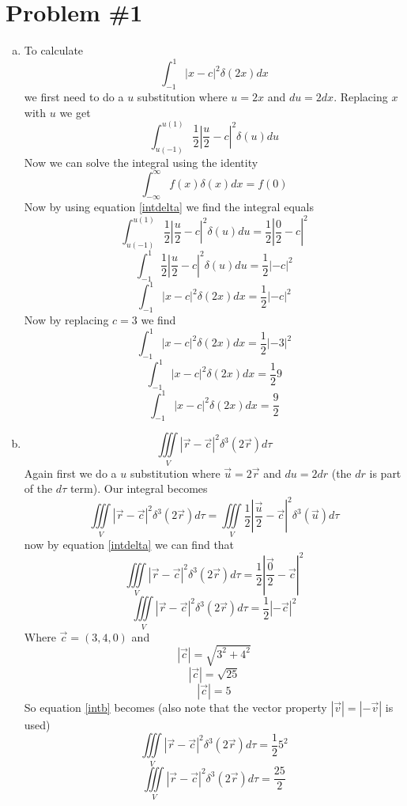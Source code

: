 \documentclass[11pt]{article}
\numberwithin{equation}{section}
\begin{document}


\section{Problem \#1}
\begin{enumerate}[(a)]
\item
To calculate 
\begin{equation}
\int_{-1}^{1} |x-c|^2 \delta(2x) dx
\label{inta}
\end{equation}
we first need to do a $u$ substitution where $u = 2x$ and $du = 2dx$. Replacing $x$ with $u$ we get
$$\int_{u(-1)}^{u(1)} \frac{1}{2} \left|\frac{u}{2}-c\right|^2 \delta(u) du$$
Now we can solve the integral using the identity 
\begin{equation}
\int_{-\infty}^{\infty} f(x) \delta(x) dx = f(0)
\label{intdelta}
\end{equation}
Now by using equation \ref{intdelta} we find the integral equals 
$$\int_{u(-1)}^{u(1)} \frac{1}{2} \left|\frac{u}{2}-c\right|^2 \delta(u) du = \frac{1}{2}\left|\frac{0}{2}-c\right|^2 $$
$$\int_{-1}^{1} \frac{1}{2} \left|\frac{u}{2}-c\right|^2 \delta(u) du = \frac{1}{2}\left|-c\right|^2 $$
$$\int_{-1}^{1}  \left|x-c\right|^2 \delta(2x) dx = \frac{1}{2}\left|-c\right|^2 $$
Now by replacing $c=3$ we find
$$\int_{-1}^{1}  \left|x-c\right|^2 \delta(2x) dx = \frac{1}{2}\left|-3\right|^2 $$
$$\int_{-1}^{1}  \left|x-c\right|^2 \delta(2x) dx = \frac{1}{2}9 $$
$$\int_{-1}^{1}  \left|x-c\right|^2 \delta(2x) dx = \frac{9}{2} $$
\begin{center}
\end{center}

\item
\begin {equation}
\iiint\limits_V  \left|\vec{r} - \vec{c}\right|^2 \delta^3(2\vec{r})d\tau
\label{intb}
\end{equation}
Again first we do a $u$ substitution where $\vec{u} = 2\vec{r}$ and $du = 2 dr$ (the $dr$ is part of the $d\tau$ term). Our integral becomes 
$$\iiint\limits_V  \left|\vec{r} - \vec{c}\right|^2 \delta^3(2\vec{r})d\tau = \iiint\limits_V \frac{1}{2} \left|\frac{\vec{u}}{2} - \vec{c}\right|^2 \delta^3(\vec{u})d\tau $$
now by equation \ref{intdelta} we can find that
$$\iiint\limits_V  \left|\vec{r} - \vec{c}\right|^2 \delta^3(2\vec{r})d\tau = \frac{1}{2} \left|\frac{\vec{0}}{2} - \vec{c}\right|^2$$
$$\iiint\limits_V  \left|\vec{r} - \vec{c}\right|^2 \delta^3(2\vec{r})d\tau = \frac{1}{2} \left|-\vec{c}\right|^2$$
Where $\vec{c} = (3,4,0)$ and 
$$|\vec{c}| = \sqrt{3^2 + 4^2}$$
$$|\vec{c}| = \sqrt{25}$$
$$|\vec{c}| = 5$$
So equation \ref{intb} becomes (also note that the vector property $|\vec{v}| = |-\vec{v}|$ is used)
$$\iiint\limits_V  \left|\vec{r} - \vec{c}\right|^2 \delta^3(2\vec{r})d\tau = \frac{1}{2} 5^2$$
$$\iiint\limits_V  \left|\vec{r} - \vec{c}\right|^2 \delta^3(2\vec{r})d\tau = \frac{25}{2}$$
\begin{center}
\end{center}


\end{enumerate}
\end{document}
